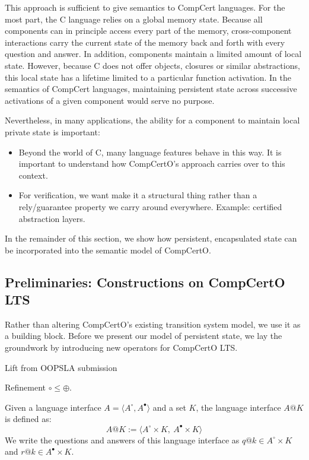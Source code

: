 \documentclass[acmsmall,screen,review,anonymous]{acmart}
\newcommand{\que}{\circ}
\newcommand{\ans}{\bullet}
\begin{document}
This approach is sufficient to give semantics to CompCert languages.
For the most part, the C language relies on a global memory state.
Because all components can in principle access every part of the memory,
cross-component interactions carry the current state of the memory
back and forth with every question and answer.
In addition,
components maintain a limited amount of local state.
However,
because C does not offer objects, closures or similar abstractions,
this local state has a lifetime limited to a particular function activation.
In the semantics of CompCert languages,
maintaining persistent state across successive activations of a given component
would serve no purpose.

Nevertheless, in many applications,
the ability for a component to maintain local private state
is important:
\begin{itemize}
  \item Beyond the world of C,
    many language features behave in this way.
    It is important to understand how CompCertO's approach
    carries over to this context.
  \item For verification,
    we want make it a structural thing
    rather than a rely/guarantee property we carry around everywhere.
    Example: certified abstraction layers.
\end{itemize}
In the remainder of this section,
we show how persistent, encapsulated state
can be incorporated into
the semantic model of CompCertO.

\subsection{Preliminaries: Constructions on CompCertO LTS}

Rather than altering CompCertO's existing transition system model,
we use it as a building block.
Before we present our model of persistent state,
we lay the groundwork by introducing new operators
for CompCertO LTS.

\begin{definition}
Lift from OOPSLA submission
\end{definition}

\begin{lemma}
Refinement ${\circ} \le {\oplus}$.
\end{lemma}

\begin{definition}
Given a language interface $A = \langle A^\que, A^\ans \rangle$
and a set $K$,
the language interface $A@K$ is defined as:
\[
  A@K := \langle A^\que \times K ,\: A^\ans \times K \rangle
\]
We write the questions and answers of this language interface as
$q@k \in A^\que \times K$ and
$r@k \in A^\ans \times K$.
\end{definition}
\end{document}
